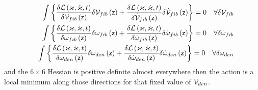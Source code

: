\begin{eqnarray}
&&\int \left\{ \frac{\delta {\cal L}\left( \varkappa ,\dot{\varkappa}%
,t\right) }{\delta {\cal V}_{fib}\left( {\sf z}\right) }\delta {\cal V}%
_{fib}\left( {\sf z}\right) +\frac{\delta {\cal L}\left( \varkappa ,\dot{%
\varkappa},t\right) }{\delta {\cal \dot{V}}_{fib}\left( {\sf z}\right) }%
\delta {\cal \dot{V}}_{fib}\left( {\sf z}\right) \right\} =0\quad \forall
\delta {\cal V}_{fib}  \nonumber \\
&&\int \left\{ \frac{\delta {\cal L}\left( \varkappa ,\dot{\varkappa}%
,t\right) }{\delta {\cal \omega }_{fib}\left( {\sf z}\right) }\delta {\cal %
\omega }_{fib}\left( {\sf z}\right) +\frac{\delta {\cal L}\left( \varkappa ,%
\dot{\varkappa},t\right) }{\delta {\cal \dot{\omega}}_{fib}\left( {\sf z}%
\right) }\delta {\cal \dot{\omega}}_{fib}\left( {\sf z}\right) \right\}
=0\quad \forall \delta {\cal \omega }_{fib}  \nonumber \\
&&\int \left\{ \frac{\delta {\cal L}\left( \varkappa ,\dot{\varkappa}%
,t\right) }{\delta {\cal \omega }_{den}\left( {\sf z}\right) }\delta {\cal %
\omega }_{den}\left( {\sf z}\right) +\frac{\delta {\cal L}\left( \varkappa ,%
\dot{\varkappa},t\right) }{\delta {\cal \dot{\omega}}_{den}\left( {\sf z}%
\right) }\delta {\cal \dot{\omega}}_{den}\left( {\sf z}\right) \right\}
=0\quad \forall \delta {\cal \omega }_{den}
\end{eqnarray}%
and the $6\times 6$ Hessian is positive definite almost everywhere then the
action is a local minimum along those directions for that fixed value of $%
{\cal V}_{den}$.
